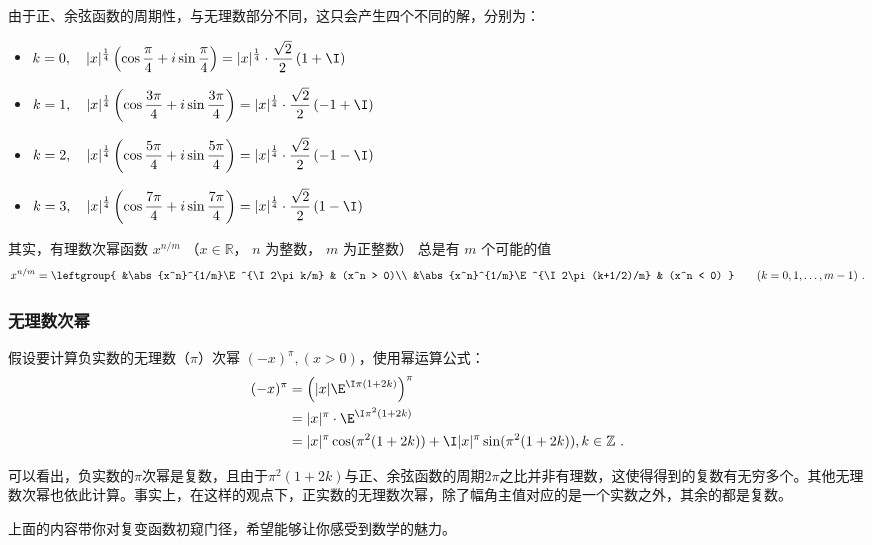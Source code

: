 由于正、余弦函数的周期性，与无理数部分不同，这只会产生四个不同的解，分别为：

\begin{itemize}
\item $\displaystyle k = 0,\quad |x|^{\frac{1}{4}} \left( \cos\frac{\pi}{4} + i\sin\frac{\pi}{4} \right) = |x|^{\frac{1}{4}} \cdot \frac{\sqrt{2}}{2} \left( 1 + \I \right)$
\item $\displaystyle k = 1,\quad |x|^{\frac{1}{4}} \left( \cos\frac{3\pi}{4} + i\sin\frac{3\pi}{4} \right) = |x|^{\frac{1}{4}} \cdot \frac{\sqrt{2}}{2} \left( -1 +\I \right)$
\item $\displaystyle k = 2,\quad |x|^{\frac{1}{4}} \left( \cos\frac{5\pi}{4} + i\sin\frac{5\pi}{4} \right) = |x|^{\frac{1}{4}} \cdot \frac{\sqrt{2}}{2} \left( -1 - \I \right)$
\item $\displaystyle k = 3,\quad |x|^{\frac{1}{4}} \left( \cos\frac{7\pi}{4} + i\sin\frac{7\pi}{4} \right) = |x|^{\frac{1}{4}} \cdot \frac{\sqrt{2}}{2} \left( 1 - \I \right)$
\end{itemize}

其实，有理数次幂函数 $x^{n/m}$ （$x\in \mathbb R$， $n$ 为整数， $m$ 为正整数） 总是有 $m$ 个可能的值
\begin{equation}
x^{n/m} = \leftgroup{
&\abs{x^n}^{1/m}\E^{\I 2\pi k/m} & (x^n > 0)\\
&\abs{x^n}^{1/m}\E^{\I 2\pi (k+1/2)/m} & (x^n < 0)
}\qquad (k = 0,1,\dots, m-1)~.
\end{equation}

\subsubsection{无理数次幂}

假设要计算负实数的无理数（$\pi$）次幂 $(-x)^\pi,(x>0)$，使用幂运算公式：
\begin{equation}
\begin{split}
\displaystyle
(-x)^\pi &= \left( |x| \E^{\I\pi(1+2k)} \right)^\pi \\
&=|x|^\pi \cdot \E^{\I\pi^2(1+2k)}\\
&=|x|^\pi\cos(\pi^2(1+2k)) + \I|x|^\pi\sin(\pi^2(1+2k)),k\in\mathbb{Z}~.
\end{split}
\end{equation}

可以看出，负实数的$\pi$次幂是复数，且由于$\pi^2(1+2k)$与正、余弦函数的周期$2\pi$之比并非有理数，这使得得到的复数有无穷多个。其他无理数次幂也依此计算。事实上，在这样的观点下，正实数的无理数次幂，除了幅角主值对应的是一个实数之外，其余的都是复数。

上面的内容带你对复变函数初窥门径，希望能够让你感受到数学的魅力。
